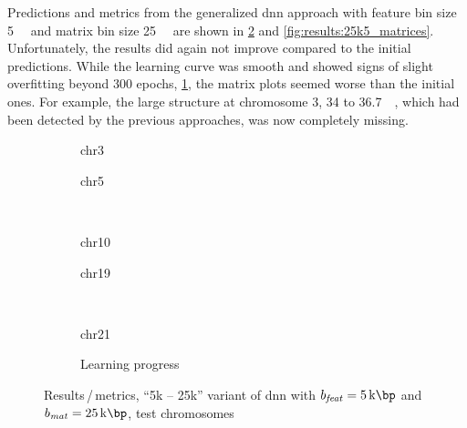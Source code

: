 Predictions and metrics from the generalized \acrshort{dnn} approach with feature bin size \SI{5}{\kilo\bp} and matrix bin size \SI{25}{\kilo\bp}
are shown in \cref{fig:results:25k5DNN_pearson} and \ref{fig:results:25k5_matrices}.
Unfortunately, the results did again not improve compared to the initial predictions.
While the learning curve was smooth and showed signs of slight overfitting beyond 300 epochs, \cref{fig:results:25k5DNN_lossEpochs},
the matrix plots seemed worse than the initial ones. 
For example, the large structure at chromosome 3, 34 to \SI{36.7}{\kilo\bp}, which had been detected by the previous approaches, was now completely missing.
\begin{figure}[p]%
    \begin{subfigure}{0.45\textwidth}
        \scriptsize
        \caption{chr3}
    \end{subfigure} \hfill
    \begin{subfigure}{0.45\textwidth}
        \scriptsize
        \caption{chr5}
    \end{subfigure}\\[5mm]
    \begin{subfigure}{0.45\textwidth}
        \scriptsize
        \caption{chr10}
    \end{subfigure}\hfill
    \begin{subfigure}{0.45\textwidth}
        \scriptsize
        \caption{chr19}
    \end{subfigure}\\[3mm]
    \centering
    \begin{subfigure}{0.45\textwidth}
        \scriptsize
        \caption{chr21}
    \end{subfigure}\hfill
    \begin{subfigure}{0.45\textwidth}
        \caption{Learning progress} \label{fig:results:25k5DNN_lossEpochs}
    \end{subfigure}
    \caption{Results\,/\,metrics, ``5k -- 25k'' variant of \acrshort{dnn} with $b_\mathit{feat}=\SI{5}{\kilo\bp}$ and $b_\mathit{mat}=\SI{25}{\kilo\bp}$,  test chromosomes}
    \label{fig:results:25k5DNN_pearson}
\end{figure}
